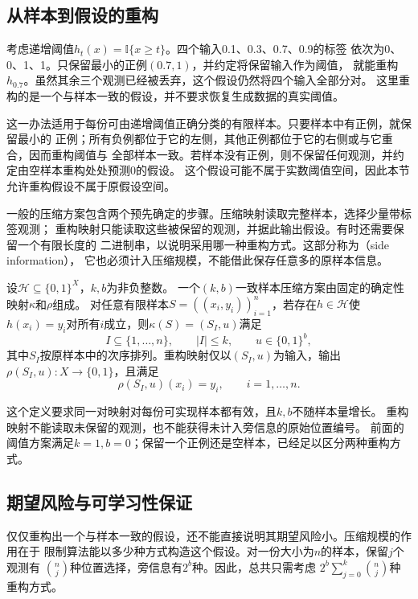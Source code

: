 \subsection{从样本到假设的重构}

考虑递增阈值$h_t(x)=\mathbb I\{x\geq t\}$。四个输入0.1、0.3、0.7、0.9的标签
依次为0、0、1、1。只保留最小的正例$(0.7,1)$，并约定将保留输入作为阈值，
就能重构$h_{0.7}$。虽然其余三个观测已经被丢弃，这个假设仍然将四个输入全部分对。
这里重构的是一个与样本一致的假设，并不要求恢复生成数据的真实阈值。

这一办法适用于每份可由递增阈值正确分类的有限样本。只要样本中有正例，就保留最小的
正例；所有负例都位于它的左侧，其他正例都位于它的右侧或与它重合，因而重构阈值与
全部样本一致。若样本没有正例，则不保留任何观测，并约定由空样本重构处处预测0的假设。
这个假设可能不属于实数阈值空间，因此本节允许重构假设不属于原假设空间。

一般的压缩方案包含两个预先确定的步骤。压缩映射读取完整样本，选择少量带标签观测；
重构映射只能读取这些被保留的观测，并据此输出假设。有时还需要保留一个有限长度的
二进制串，以说明采用哪一种重构方式。这部分称为（side information），
它也必须计入压缩规模，不能借此保存任意多的原样本信息。

\begin{definition}[一致样本压缩方案]
\label{def:sample-compression}
设$\mathcal H\subseteq\{0,1\}^X$，$k,b$为非负整数。
一个$(k,b)$一致样本压缩方案由固定的确定性映射$\kappa$和$\rho$组成。
对任意有限样本$S=((x_i,y_i))_{i=1}^n$，若存在$h\in\mathcal H$使
$h(x_i)=y_i$对所有$i$成立，则$\kappa(S)=(S_I,u)$满足
\[
 I\subseteq\{1,\ldots,n\},\qquad |I|\leq k,\qquad u\in\{0,1\}^b,
\]
其中$S_I$按原样本中的次序排列。重构映射仅以$(S_I,u)$为输入，输出
$\rho(S_I,u):X\to\{0,1\}$，且满足
\[
 \rho(S_I,u)(x_i)=y_i,\qquad i=1,\ldots,n.
\]
\end{definition}

这个定义要求同一对映射对每份可实现样本都有效，且$k,b$不随样本量增长。
重构映射不能读取未保留的观测，也不能获得未计入旁信息的原始位置编号。
前面的阈值方案满足$k=1,b=0$；保留一个正例还是空样本，已经足以区分两种重构方式。

\subsection{期望风险与可学习性保证}

仅仅重构出一个与样本一致的假设，还不能直接说明其期望风险小。压缩规模的作用在于
限制算法能以多少种方式构造这个假设。对一份大小为$n$的样本，保留$j$个观测有
$\binom nj$种位置选择，旁信息有$2^b$种。因此，总共只需考虑
$2^b\sum_{j=0}^k\binom nj$种重构方式。

